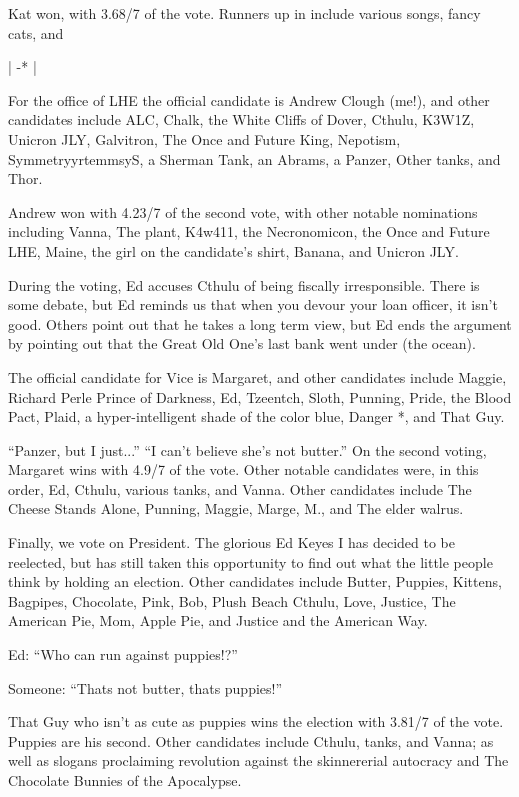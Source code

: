 \documentclass[12pt]{article}
\begin{document}
Kat won, with 3.68/7 of the vote.  Runners up in include various songs, fancy cats, and 

|
-*
|

For the office of LHE the official candidate is Andrew Clough (me!), and other candidates include ALC, Chalk, the White Cliffs of Dover, Cthulu, K3W1Z, Unicron JLY, Galvitron, The Once and Future King, Nepotism, SymmetryyrtemmsyS, a Sherman Tank, an Abrams, a Panzer, Other tanks, and Thor.

Andrew won with 4.23/7 of the second vote, with other notable nominations including Vanna, The plant, K4w411, the Necronomicon, the Once and Future LHE, Maine, the girl on the candidate's shirt, Banana, and Unicron JLY. 

During the voting, Ed accuses Cthulu of being fiscally irresponsible.  There is some debate, but Ed reminds us that when you devour your loan officer, it isn't good.  Others point out that he takes a long term view, but Ed ends the argument by pointing out that the Great Old One's last bank went under (the ocean).

The official candidate for Vice is Margaret, and other candidates include Maggie, Richard Perle Prince of Darkness, Ed, Tzeentch, Sloth, Punning, Pride, the Blood Pact, Plaid, a hyper-intelligent shade of the color blue, Danger *, and That Guy.

``Panzer, but I just...''  ``I can't believe she's not butter.''
On the second voting, Margaret wins with 4.9/7 of the vote.  Other notable candidates were, in this order, Ed, Cthulu, various tanks, and Vanna.  Other candidates include The Cheese Stands Alone, Punning, Maggie, Marge, M., and The elder walrus.

Finally, we vote on President.  The glorious Ed Keyes I has decided to be reelected, but has still taken this opportunity to find out what the little people think by holding an election.  Other candidates include Butter, Puppies, Kittens, Bagpipes, Chocolate, Pink, Bob, Plush Beach Cthulu, Love, Justice, The American Pie, Mom, Apple Pie, and Justice and the American Way.

Ed:  ``Who can run against puppies!?''

Someone:  ``Thats not butter, thats puppies!''

That Guy who isn't as cute as puppies wins the election with 3.81/7 of the vote. Puppies are his second.  Other candidates include Cthulu, tanks, and Vanna; as well as slogans proclaiming revolution against the skinnererial autocracy and The Chocolate Bunnies of the Apocalypse.  
\end{document}
